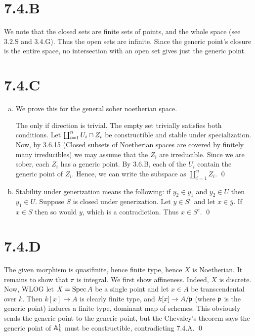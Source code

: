 \documentclass{article}
\begin{document}
\section{7.4.B}
We note that the closed sets are finite sets of points, and the whole space
(see 3.2.S and 3.4.G). Thus the open sets are infinite. Since the generic
point's closure is the entire space, no intersection with an open set gives
just the generic point.

\section{7.4.C}
\begin{enumerate}[a.]
    \item We prove this for the general sober noetherian space.

          The only if direction is trivial. The empty set trivially satisfies both
          conditions. Let $\coprod_{i=1}^n U_i \cap Z_i$ be constructible and stable under
          specialization. Now, by 3.6.15 (Closed subsets of Noetherian spaces are covered
          by finitely many irreducibles) we may assume that the $Z_i$
          are irreducible. Since we are sober, each $Z_i$ has a generic
          point. By 3.6.B, each of the $U_i$ contain the generic point
          of $Z_i$. Hence, we can write the subspace as
          $\coprod_{i=1}^n Z_i$. \qed
    \item Stability under generization means the following: if $y_2 \in \overline{y_1}$
          and $y_2 \in U$ then $y_1 \in U$. Suppose
          $S$ is closed under generization. Let
          $y \in S^{\text{c}}$ and let $x \in \overline{y}$. If
          $x \in S$ then so would $y$, which is a
          contradiction. Thus $x \in S^{\text{c}}$. \qed
\end{enumerate}

\section{7.4.D}
The given morphism is quasifinite, hence finite type, hence
$X$ is Noetherian. It remains to show that
$\pi$ is integral. We first show affineness. Indeed,
$X$ is discrete. Now, WLOG let $X=\operatorname{Spec} A$ be a
single point and let $x \in A$ be transcendental over
$k$. Then $k[x] \to A$ is clearly finite type,
and $k[x] \to A/\mathfrak{p}$ (where $\mathfrak{p}$ is the generic
point) induces a finite type, dominant map of schemes. This obviously sends the
generic point to the generic point, but the Chevaley's theorem says the generic
point of $\mathbb{A}_k^1$ must be constructible, contradicting 7.4.A.
\qed
\end{document}
